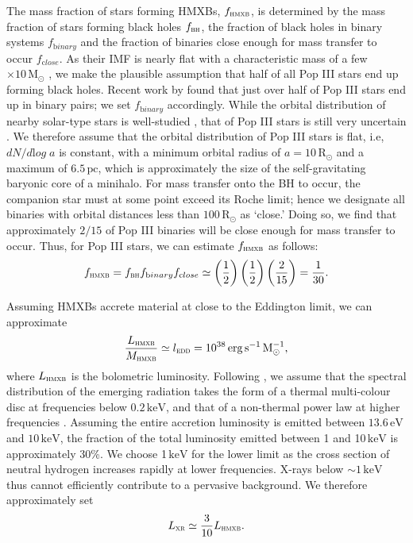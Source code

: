 \documentclass{thesis}
\newcommand{\s}{\ensuremath{\,\mathrm{s}}\xspace}
\newcommand{\msun}{\ensuremath{\,\mathrm{M}_{\odot}}\xspace}
\newcommand{\rsun}{\ensuremath{\,\mathrm{R}_{\odot}}\xspace}
\newcommand{\pc}{\ensuremath{\,\mathrm{pc}}\xspace}
\newcommand{\ev}{\ensuremath{\,\mathrm{eV}}\xspace}
\newcommand{\kev}{\ensuremath{\,\mathrm{keV}}\xspace}
\newcommand{\erg}{\ensuremath{\,\mathrm{erg}}\xspace}
\newcommand{\Lxr}{\ensuremath{L_{\textsc{xr}}}\xspace}
\newcommand{\xrb}{\ensuremath{\textsc{hmxb}}\xspace}
\begin{document}
The mass fraction of stars forming HMXBs, $f_{\xrb}$, is determined by
the mass fraction of stars forming black holes $f_{\textsc{bh}}$, the
fraction of black holes in binary systems $f_{\mathrm binary}$ and the
fraction of binaries close enough for mass transfer to occur
$f_{\mathrm close}$. As their IMF is nearly flat with a characteristic
mass of a few $\times10\msun$ \citep{Bromm2013}, we make the
plausible assumption that half of all Pop III stars end up forming
black holes.  Recent work by \citet{StacyBromm2013} found that just
over half of Pop III stars end up in binary pairs; we set $f_{\mathrm
  binary}$ accordingly. While the orbital distribution of nearby
solar-type stars is well-studied \citep[e.g.,][]{DuquennoyMayor1991},
that of Pop III stars is still very uncertain \citep[but
see][]{StacyBromm2013}.  We therefore assume that the orbital
distribution of Pop III stars is flat, i.e, $dN/d{\mathrm log} \; a$ is
constant, with a minimum orbital radius of $a=10\rsun$ and a maximum of
$6.5\pc$, which is approximately the size of the self-gravitating baryonic core of a minihalo. For mass transfer onto the BH to occur, the companion star
must at some point exceed its Roche limit; hence we designate all
binaries with orbital distances less than $100\rsun$ as `close.'
Doing so, we find that approximately $2/15$ of Pop III binaries will be
close enough for mass transfer to occur.
 Thus, for Pop III stars, we can estimate $f_{\xrb}$ as follows:  
\begin{equation}
  f_{\xrb} = f_{\textsc{bh}} f_{\mathrm binary} f_{\mathrm close} \simeq \left(\frac{1}{2}\right) 
  \left(\frac{1}{2}\right) \left(\frac{2}{15}\right) = \frac{1}{30}.
\end{equation}

Assuming HMXBs accrete material at close to the Eddington limit, we can approximate 
\begin{equation}
  \frac{L_{\xrb}}{M_{\xrb}} \simeq l_\textsc{edd} = 10^{38} \erg \s^{-1} \msun^{-1},
\end{equation}
where $L_{\xrb}$ is the bolometric luminosity.  Following \citet{Jeonetal2014a}, we assume that the spectral distribution of the
emerging radiation takes the form of a thermal multi-colour disc at
frequencies below $0.2 \kev$, and that of a non-thermal power law at
higher frequencies \citep[e.g.,][]{Mitsudaetal1984}.  Assuming the entire accretion luminosity is
emitted between $13.6\ev$ and $10\kev$, the fraction of the total
luminosity emitted between 1 and 10\kev is approximately 30\%.  We
choose 1\kev for the lower limit as the cross section of neutral
hydrogen increases rapidly at lower frequencies.   X-rays below
$\sim1\kev$ thus cannot efficiently contribute to a pervasive
background.  We therefore approximately set
\begin{equation}
\Lxr \simeq \frac{3}{10} L_{\xrb}.
\end{equation}
\end{document}
